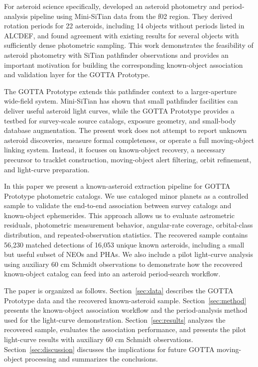 \documentclass[referee]{raa}
\begin{document}
For asteroid science specifically, \citet{LiuZhaoxing2025AsteroidLC} developed an asteroid photometry and period-analysis pipeline using Mini-SiTian data from the f02 region. They derived rotation periods for 22 asteroids, including 14 objects without periods listed in ALCDEF, and found agreement with existing results for several objects with sufficiently dense photometric sampling. This work demonstrates the feasibility of asteroid photometry with SiTian pathfinder observations and provides an important motivation for building the corresponding known-object association and validation layer for the GOTTA Prototype.

The GOTTA Prototype extends this pathfinder context to a larger-aperture wide-field system. Mini-SiTian has shown that small pathfinder facilities can deliver useful asteroid light curves, while the GOTTA Prototype provides a testbed for survey-scale source catalogs, exposure geometry, and small-body database augmentation. The present work does not attempt to report unknown asteroid discoveries, measure formal completeness, or operate a full moving-object linking system. Instead, it focuses on known-object recovery, a necessary precursor to tracklet construction, moving-object alert filtering, orbit refinement, and light-curve preparation.

In this paper we present a known-asteroid extraction pipeline for GOTTA Prototype photometric catalogs. We use cataloged minor planets as a controlled sample to validate the end-to-end association between survey catalogs and known-object ephemerides. This approach allows us to evaluate astrometric residuals, photometric measurement behavior, angular-rate coverage, orbital-class distribution, and repeated-observation statistics. The recovered sample contains 56,230 matched detections of 16,053 unique known asteroids, including a small but useful subset of NEOs and PHAs. We also include a pilot light-curve analysis using auxiliary 60 cm Schmidt observations to demonstrate how the recovered known-object catalog can feed into an asteroid period-search workflow.

The paper is organized as follows. Section~\ref{sec:data} describes the GOTTA Prototype data and the recovered known-asteroid sample. Section~\ref{sec:method} presents the known-object association workflow and the period-analysis method used for the light-curve demonstration. Section~\ref{sec:results} analyzes the recovered sample, evaluates the association performance, and presents the pilot light-curve results with auxiliary 60 cm Schmidt observations. Section~\ref{sec:discussion} discusses the implications for future GOTTA moving-object processing and summarizes the conclusions.
\end{document}
